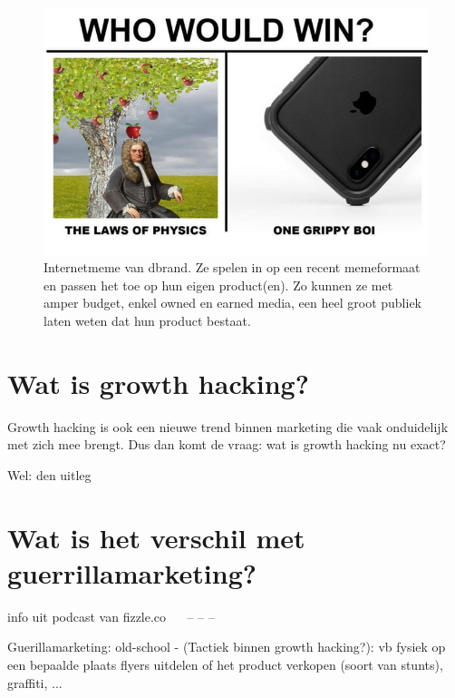 \begin{figure}[h!]
	\includegraphics[width=\linewidth]{img/dbrand-internetmeme.jpg}
	\centering
	\caption{Internetmeme van dbrand. Ze spelen in op een recent memeformaat en passen het toe op hun eigen product(en). Zo kunnen ze met amper budget, enkel owned en earned media, een heel groot publiek laten weten dat hun product bestaat.}
	\label{fig:defGrowthHacker}
\end{figure}

\section{Wat is growth hacking?}
\label{sec:wat-is-growth-hacking}
Growth hacking is ook een nieuwe trend binnen marketing die vaak onduidelijk met zich mee brengt. Dus dan komt de vraag: wat is growth hacking nu exact?

Wel: den uitleg

\section{Wat is het verschil met guerrillamarketing?}
\label{sec:verschil-met-guerrillamarketing}

info uit podcast van fizzle.co
~~\autocite{fizzle.co2015}
 -- -- -- 

Guerillamarketing: old-school
- (Tactiek binnen growth hacking?): vb fysiek op een bepaalde plaats flyers uitdelen of het product verkopen (soort van stunts), graffiti, ...

